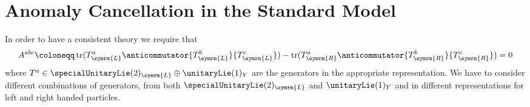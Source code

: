 \documentclass[fleqn]{NotesClass}
\DeclareMathOperator{\tr}{tr}
\newcommand{\Left}{\symrm{L}}
\newcommand{\Right}{\symrm{R}}
\begin{document}
    \section{Anomaly Cancellation in the Standard Model}
    In order to have a consistent theory we require that
    \begin{equation}
        A^{abc} \coloneqq \tr(T^a_{\Left} \anticommutator{T^b_{\Left}}{T^c_{\Left}}) - \tr(T^a_{\Right} \anticommutator{T^b_{\Right}}{T^c_{\Right}}) = 0
    \end{equation}
    where \(T^a \in \specialUnitaryLie(2)_{\Left} \oplus \unitaryLie(1)_Y\) are the generators in the appropriate representation.
    We have to consider different combinations of generators, from both \(\specialUnitaryLie(2)_{\Left}\) and \(\unitaryLie(1)_{Y}\) and in different representations for left and right handed particles.
\end{document}
